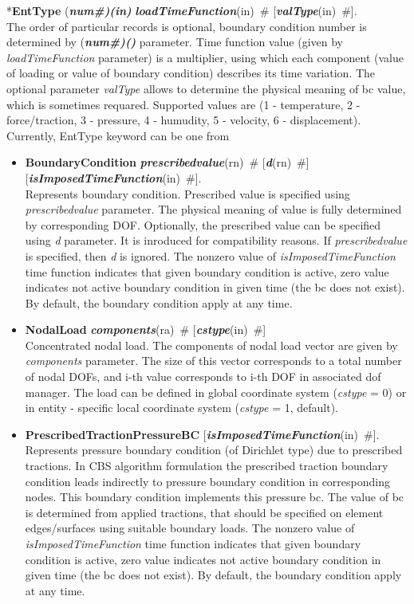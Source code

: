 \documentclass[draft]{article}
\newcommand{\param}[1]{{\em #1}}
\newcommand{\fieldVal}[2]{\mbox{({\it\bf{#1}\#)\tiny (#2)}}}
\newcommand{\keywordnotype}[1]{\mbox{{\it{\bf{#1}}}}}
\newcommand{\keyword}[2]{\mbox{{\keywordnotype{#1}\tiny (#2)}}}
\newcommand{\entKeyword}[1]{\mbox{{*{\bf{#1}}}}}
\newcommand{\entKeywordInst}[1]{\mbox{{\bf{{#1}}}}}
\newcommand{\field}[2]{\mbox{\keyword{#1}{#2}~\#}}
\newcommand{\optField}[2]{\mbox{[\field{#1}{#2}]}}
\begin{document}
\entKeyword{EntType} \fieldVal{num}{in}
\field{loadTimeFunction}{in} \optField{valType}{in}.\\

The order of particular  records is optional, boundary condition number is determined by \fieldVal{num}{} parameter.
Time function value (given by \param{loadTimeFunction} parameter) is a multiplier, using which
each  component (value of loading or value of boundary condition)
describes its time variation. 
The optional parameter \param{valType} allows to determine the
physical meaning of bc value, which is sometimes requared. Supported
values are (1 - temperature, 2 - force/traction,
3 - pressure, 4 - humudity, 5 - velocity, 6 - displacement). 
Currently, EntType keyword can be one from
\begin{itemize}
\item \entKeywordInst{BoundaryCondition}
\field{prescribedvalue}{rn} \optField{d}{rn}\\
\optField{is\-Impo\-sed\-Ti\-me\-Fun\-ction}{in}.\\
Represents boundary condition. 
Prescribed value is specified using \param{prescribedvalue} parameter. The
physical meaning of value is fully determined by corresponding DOF.
Optionally, the prescribed value can be specified using \param{d}
parameter. It is inroduced for compatibility reasons. If
\param{prescribedvalue} is specified, then \param{d} is ignored.
The nonzero value of \param{isImposedTimeFunction} time function
indicates that given boundary condition is active, zero value
indicates not active boundary condition in given time (the bc does not
exist). By default, the boundary condition apply at any time.
\item \entKeywordInst{NodalLoad}
\field{components}{ra} \optField{cstype}{in}\\
Concentrated nodal load. The components of nodal load vector 
are given by \param{components} parameter. The size of this vector
corresponds to a total number of nodal DOFs, and i-th value
corresponds to i-th DOF in associated dof manager. The load can be defined in global coordinate system (\param{cstype} =
0) or in entity - specific local coordinate system
(\param{cstype} = 1, default).
\item \entKeywordInst{PrescribedTractionPressureBC} \optField{is\-Impo\-sed\-Ti\-me\-Fun\-ction}{in}.\\
Represents pressure boundary condition (of Dirichlet type) due to
prescribed tractions. 
In CBS algorithm formulation the prescribed traction
boundary condition leads indirectly to pressure boundary condition in
corresponding nodes. This boundary condition implements this pressure
bc. The value of bc is determined from applied tractions, that  should be specified on element edges/surfaces using 
suitable boundary loads.
The nonzero value of \param{isImposedTimeFunction} time function
indicates that given boundary condition is active, zero value
indicates not active boundary condition in given time (the bc does not
exist). By default, the boundary condition apply at any time.
\end{itemize}
\end{document}
